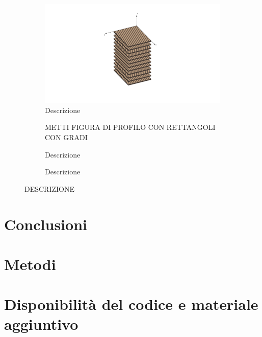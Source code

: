 \documentclass[a4paper,num-refs]{oup-contemporary}
\begin{document}
\begin{figure}[bt!]
	\centering
	\begin{subfigure}[t]{0.3\textwidth}
		\centering
		
		\includegraphics[width=\textwidth]{struct5.pdf}
		\caption{Descrizione}
			\label{fig:last_case_schema}
	\end{subfigure}
	\hfill
	\begin{subfigure}[t]{0.3\textwidth}
		\centering
		METTI FIGURA DI PROFILO CON RETTANGOLI CON GRADI
		\caption{Descrizione}
		
	\end{subfigure}
	\hfill
	\begin{subfigure}[t]{0.3\textwidth}
		\centering
		\caption{Descrizione}
		
	\end{subfigure}
	\hfill
	\caption{ DESCRIZIONE }
	\label{fig:last_case}
\end{figure}

\textcolor{blue}{\lipsum[1-2]}


\section{Conclusioni}

\textcolor{blue}{\lipsum[1-2]}
\section{Metodi}

\textcolor{blue}{\lipsum[1-2]}


\section{Disponibilità del codice e materiale aggiuntivo}
\end{document}
